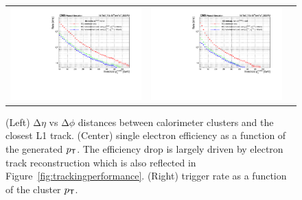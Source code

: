  \begin{figure}[tbh!]
 \begin{center}
  \begin{tabular}{ccc}
   \includegraphics[width=.45\linewidth]{figures/Part2/Upgrade/Rate_barrel}&
   \includegraphics[width=.45\linewidth]{figures/Part2/Upgrade/Rate_endcap}&
  \end{tabular}
  \caption{(Left) $\mathrm{\Delta}\eta$ vs $\mathrm{\Delta}\phi$ distances between calorimeter clusters and the closest L1 track. (Center) single electron efficiency as a function of the generated $p_{\textsf{T}}$. The efficiency drop is largely driven by electron track reconstruction which is also reflected in Figure~\ref{fig:trackingperformance}. (Right) trigger rate as a function of the cluster $p_{\textsf{T}}$.}
 \label{fig:rate_electron}
 \end{center}
\end{figure}